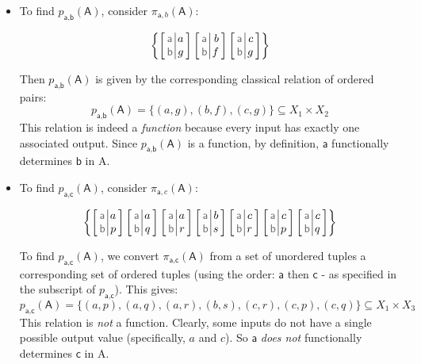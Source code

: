 \begin{itemize}
\item 
To find $p_{\textsf{a},\textsf{b}}(\textsf{A})$, 
consider $\pi_{\textsf{a},{b}}(\textsf{A})$:

$$
\arraycolsep=2pt
\left\{
\ratuple {
    \textsf{a} & a \\
    \textsf{b} & g \\
}
\ratuple {
    \textsf{a} & b \\
    \textsf{b} & f \\
}
\ratuple {
    \textsf{a} & c \\
    \textsf{b} & g \\
}
\right\}
$$

Then $p_{\textsf{a},\textsf{b}}(\textsf{A})$ is given by the corresponding 
classical relation of ordered pairs:
$$
p_{\textsf{a},\textsf{b}}(\textsf{A}) = \{(a,g),(b,f),(c,g)\} \subseteq X_1 \times X_2
$$
This relation is indeed a \textit{function} because every input has exactly one associated output. 
Since $p_{\textsf{a},\textsf{b}}(\textsf{A})$ is a function,
by definition, $\textsf{a}$ functionally determines $\textsf{b}$ in \textsf{A}.
\item 
To find $p_{\textsf{a},\textsf{c}}(\textsf{A})$, 
consider $\pi_{\textsf{a},{c}}(\textsf{A})$:

$$
\arraycolsep=2pt
\left\{
\ratuple {
    \textsf{a} & a \\
    \textsf{b} & p \\
}
\ratuple {
    \textsf{a} & a \\
    \textsf{b} & q \\
}
\ratuple {
    \textsf{a} & a \\
    \textsf{b} & r \\
}
\ratuple {
    \textsf{a} & b \\
    \textsf{b} & s \\
}
\ratuple {
    \textsf{a} & c \\
    \textsf{b} & r \\
}
\ratuple {
    \textsf{a} & c \\
    \textsf{b} & p \\
}
\ratuple {
    \textsf{a} & c \\
    \textsf{b} & q \\
}
\right\}
$$

To find $p_{\textsf{a},\textsf{c}}(\textsf{A})$, we convert 
$\pi_{\textsf{a},\textsf{c}}(\textsf{A})$ from a set of unordered tuples a corresponding 
set of ordered tuples (using the order: $\textsf{a}$ then $\textsf{c}$ - as specified in the 
subscript of $p_{\textsf{a},\textsf{c}}$). This gives:
$$
p_{\textsf{a},\textsf{c}}(\textsf{A}) = \{(a,p),(a,q),(a,r),(b,s),(c,r),(c,p),(c,q)\} \subseteq X_1 \times X_3
$$
This relation is \textit{not} a function. Clearly, some inputs do not have 
a single possible output value (specifically, $a$ and $c$). 
So $\textsf{a}$ \textit{does not} functionally determines $\textsf{c}$ in \textsf{A}.
\end{itemize}


